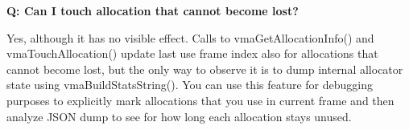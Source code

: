 {\bfseries{Q\+: Can I touch allocation that cannot become lost?}}

Yes, although it has no visible effect. Calls to vma\+Get\+Allocation\+Info() and vma\+Touch\+Allocation() update last use frame index also for allocations that cannot become lost, but the only way to observe it is to dump internal allocator state using vma\+Build\+Stats\+String(). You can use this feature for debugging purposes to explicitly mark allocations that you use in current frame and then analyze JSON dump to see for how long each allocation stays unused. 